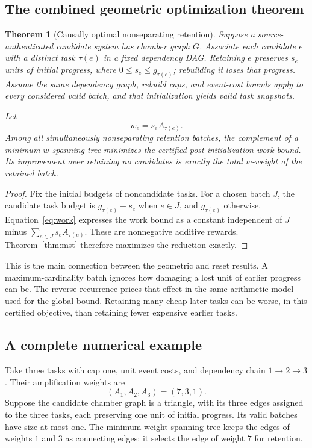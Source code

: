 \documentclass[11pt]{article}
\newtheorem{theorem}{Theorem}[section]
\theoremstyle{definition}
\begin{document}
\subsection{The combined geometric optimization theorem}
\begin{theorem}[Causally optimal nonseparating retention]\label{thm:combined}
Suppose a source-authenticated candidate system has chamber graph $G$. Associate each candidate $e$ with a distinct task $\tau(e)$ in a fixed dependency DAG. Retaining $e$ preserves $s_e$ units of initial progress, where $0\leq s_e\leq g_{\tau(e)}$; rebuilding it loses that progress. Assume the same dependency graph, rebuild caps, and event-cost bounds apply to every considered valid batch, and that initialization yields valid task snapshots.

Let
\begin{equation}\label{eq:reuse-weights}
 w_e=s_eA_{\tau(e)}.
\end{equation}
Among all simultaneously nonseparating retention batches, the complement of a minimum-$w$ spanning tree minimizes the certified post-initialization work bound. Its improvement over retaining no candidates is exactly the total $w$-weight of the retained batch.
\end{theorem}
\begin{proof}
Fix the initial budgets of noncandidate tasks. For a chosen batch $J$, the candidate task budget is $g_{\tau(e)}-s_e$ when $e\in J$, and $g_{\tau(e)}$ otherwise. Equation~\eqref{eq:work} expresses the work bound as a constant independent of $J$ minus $\sum_{e\in J}s_eA_{\tau(e)}$. These are nonnegative additive rewards. Theorem~\ref{thm:mst} therefore maximizes the reduction exactly.
\end{proof}

This is the main connection between the geometric and reset results. A maximum-cardinality batch ignores how damaging a lost unit of earlier progress can be. The reverse recurrence prices that effect in the same arithmetic model used for the global bound. Retaining many cheap later tasks can be worse, in this certified objective, than retaining fewer expensive earlier tasks.

\subsection{A complete numerical example}
Take three tasks with cap one, unit event costs, and dependency chain $1\to2\to3$. Their amplification weights are
\[
 (A_1,A_2,A_3)=(7,3,1).
\]
Suppose the candidate chamber graph is a triangle, with its three edges assigned to the three tasks, each preserving one unit of initial progress. Its valid batches have size at most one. The minimum-weight spanning tree keeps the edges of weights $1$ and $3$ as connecting edges; it selects the edge of weight $7$ for retention.
\end{document}
